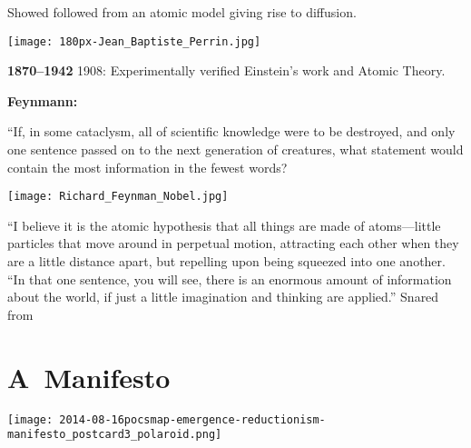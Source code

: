       Showed  
      followed from an atomic model giving rise to diffusion.
  

  \medskip
    
    
\begin{marginfigure}[]
\texttt{[image: 180px-Jean\_Baptiste\_Perrin.jpg]}\\
\end{marginfigure}

    
    \textbf{
        1870--1942}
        1908: Experimentally verified Einstein's work and Atomic Theory.
  
  \small

  \textbf{Feynmann:}
      
      ``If, in some cataclysm, all of scientific knowledge were to be
      destroyed, and only one sentence passed on to the next generation of
      creatures, what statement would contain the most information in the
      fewest words?
      
      
\begin{marginfigure}[]
\texttt{[image: Richard\_Feynman\_Nobel.jpg]}
\end{marginfigure}

    \smallskip
    {
      ``I believe it is the atomic hypothesis that all things
      are made of atoms}{---little particles that move around in perpetual
      motion, attracting each other when they are a little distance apart,
      but repelling upon being squeezed into one another.
    } 
    {
      ``In that one
      sentence, you will see, there is an enormous amount of information
      about the world, if just a little imagination and thinking are
      applied.''
    }
\tiny
Snared from 

\section{A\ Manifesto}
  
\begin{marginfigure}[]
\texttt{[image: 2014-08-16pocsmap-emergence-reductionism-manifesto\_postcard3\_polaroid.png]}
\end{marginfigure}

